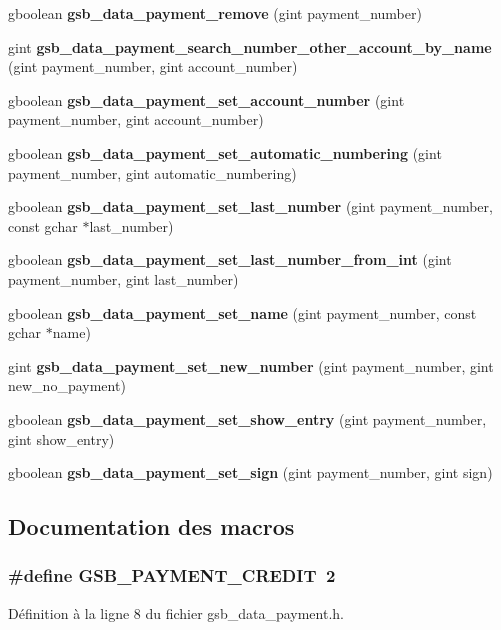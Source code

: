 \begin{DoxyCompactItemize}
gboolean {\bf gsb\_\-data\_\-payment\_\-remove} (gint payment\_\-number)
\item 
gint {\bf gsb\_\-data\_\-payment\_\-search\_\-number\_\-other\_\-account\_\-by\_\-name} (gint payment\_\-number, gint account\_\-number)
\item 
gboolean {\bf gsb\_\-data\_\-payment\_\-set\_\-account\_\-number} (gint payment\_\-number, gint account\_\-number)
\item 
gboolean {\bf gsb\_\-data\_\-payment\_\-set\_\-automatic\_\-numbering} (gint payment\_\-number, gint automatic\_\-numbering)
\item 
gboolean {\bf gsb\_\-data\_\-payment\_\-set\_\-last\_\-number} (gint payment\_\-number, const gchar $\ast$last\_\-number)
\item 
gboolean {\bf gsb\_\-data\_\-payment\_\-set\_\-last\_\-number\_\-from\_\-int} (gint payment\_\-number, gint last\_\-number)
\item 
gboolean {\bf gsb\_\-data\_\-payment\_\-set\_\-name} (gint payment\_\-number, const gchar $\ast$name)
\item 
gint {\bf gsb\_\-data\_\-payment\_\-set\_\-new\_\-number} (gint payment\_\-number, gint new\_\-no\_\-payment)
\item 
gboolean {\bf gsb\_\-data\_\-payment\_\-set\_\-show\_\-entry} (gint payment\_\-number, gint show\_\-entry)
\item 
gboolean {\bf gsb\_\-data\_\-payment\_\-set\_\-sign} (gint payment\_\-number, gint sign)
\end{DoxyCompactItemize}


\subsection{Documentation des macros}
\subsubsection[{GSB\_\-PAYMENT\_\-CREDIT}]{\setlength{\rightskip}{0pt plus 5cm}\#define GSB\_\-PAYMENT\_\-CREDIT~2}\label{gsb__data__payment_8h_aeb7171fc651a06537ca3296b3d38680b}


Définition à la ligne 8 du fichier gsb\_\-data\_\-payment.h.

